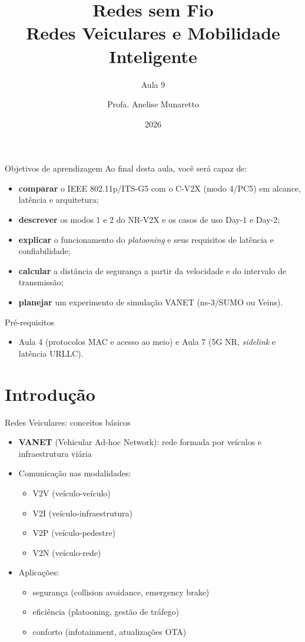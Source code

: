 \documentclass[aspectratio=169,11pt]{beamer}
\title[Redes sem Fio]{Redes sem Fio\\ Redes Veiculares e Mobilidade Inteligente}
\subtitle{Aula 9}
\author[Anelise Munaretto]{Profa. Anelise Munaretto}
\institute[Curso]{Redes sem Fio --- Ciência da Computação}
\date{2026}
\begin{document}
\begin{frame}[plain]
  \titlepage
\end{frame}

\begin{frame}{Objetivos de aprendizagem}
  Ao final desta aula, você será capaz de:
  \begin{itemize}
    \item \textbf{comparar} o IEEE 802.11p/ITS-G5 com o C-V2X (modo 4/PC5) em alcance, latência e arquitetura;
    \item \textbf{descrever} os modos 1 e 2 do NR-V2X e os casos de uso Day-1 e Day-2;
    \item \textbf{explicar} o funcionamento do \emph{platooning} e seus requisitos de latência e confiabilidade;
    \item \textbf{calcular} a distância de segurança a partir da velocidade e do intervalo de transmissão;
    \item \textbf{planejar} um experimento de simulação VANET (ns-3/SUMO ou Veins).
  \end{itemize}
  \begin{alertblock}{Pré-requisitos}
    \begin{itemize}
      \item Aula 4 (protocolos MAC e acesso ao meio) e Aula 7 (5G NR, \emph{sidelink} e latência URLLC).
    \end{itemize}
  \end{alertblock}
\end{frame}

\section{Introdução}

\begin{frame}{Redes Veiculares: conceitos básicos}
  \begin{itemize}
    \item \textbf{VANET} (Vehicular Ad-hoc Network): rede formada por veículos e infraestrutura viária
    \item Comunicação nas modalidades:
      \begin{itemize}
        \item V2V (veículo-veículo)
        \item V2I (veículo-infraestrutura)
        \item V2P (veículo-pedestre)
        \item V2N (veículo-rede)
      \end{itemize}
    \item Aplicações:
      \begin{itemize}
        \item segurança (collision avoidance, emergency brake)
        \item eficiência (platooning, gestão de tráfego)
        \item conforto (infotainment, atualizações OTA)
      \end{itemize}
  \end{itemize}
\end{frame}
\end{document}
